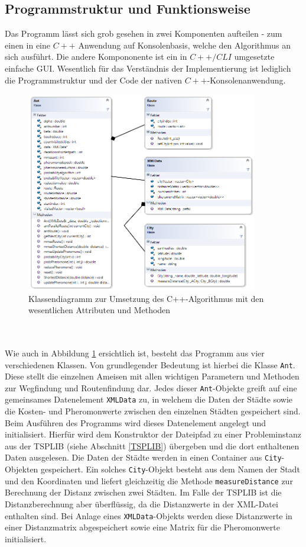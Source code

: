 \documentclass[doktyp=barbeit, sprache=german]{TUBAFarbeiten}
\begin{document}
\subsection{Programmstruktur und Funktionsweise}
\label{structure}
Das Programm lässt sich grob gesehen in zwei Komponenten aufteilen - zum einen in eine $C++$ Anwendung auf Konsolenbasis, welche den Algorithmus an sich ausführt. Die andere Kompononente ist ein in $C++/CLI$ umgesetzte einfache GUI. Wesentlich für das Verständnis der Implementierung ist lediglich die Programmstruktur und der Code der nativen $C++$-Konsolenanwendung. 
\begin{figure}
\captionsetup{justification=centering}
  \centering
     \includegraphics[width=0.9\textwidth]{images/classdiagram.png}
  \caption{Klassendiagramm zur Umsetzung des C++-Algorithmus mit den wesentlichen Attributen und Methoden}
  \label{img:classdiagram}
\end{figure}
\\\\Wie auch in Abbildung \ref{img:classdiagram} ersichtlich ist, besteht das Programm aus vier verschiedenen Klassen. Von grundlegender Bedeutung ist hierbei die Klasse \texttt{Ant}. Diese stellt die einzelnen Ameisen mit allen wichtigen Parametern und Methoden zur Wegfindung und Routenfindung dar. Jedes dieser \texttt{Ant}-Objekte greift auf eine gemeinsames Datenelement \texttt{XMLData} zu, in welchem die Daten der Städte sowie die Kosten- und Pheromonwerte zwischen den einzelnen Städten gespeichert sind. Beim Ausführen des Programms wird dieses Datenelement angelegt und initialisiert. Hierfür wird dem Konstruktor der Dateipfad zu einer Probleminstanz aus der TSPLIB (siehe Abschnitt \ref{TSPLIB}) übergeben und die dort enthaltenen Daten ausgelesen. Die Daten der Städte werden in einen Container aus \texttt{City}-Objekten gespeichert. Ein solches \texttt{City}-Objekt besteht aus dem Namen der Stadt und den Koordinaten und liefert gleichzeitig die Methode \texttt{measureDistance} zur Berechnung der Distanz zwischen zwei Städten. Im Falle der TSPLIB ist die Distanzberechnung aber überflüssig, da die Distanzwerte in der XML-Datei enthalten sind. Bei Anlage eines \texttt{XMLData}-Objekts werden diese Distanzwerte in einer Distanzmatrix abgespeichert sowie eine Matrix für die Pheromonwerte initialisiert. 
\end{document}
